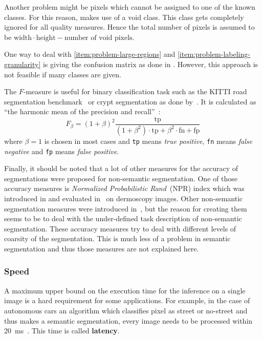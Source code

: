 Another problem might be pixels which cannot be assigned to one of the known
classes. For this reason, \cite{shotton2006textonboost} makes use of a void
class. This class gets completely ignored for all quality measures. Hence the
total number of pixels is assumed to be $\text{width} \cdot \text{height} - \text{number of void pixels}$.

One way to deal with \cref{item:problem-large-regions} and
\cref{item:problem-labeling-granularity} is giving the confusion matrix
as done in \cite{shotton2006textonboost}. However, this approach is not
feasible if many classes are given.

The $F$-measure is useful for binary classification task such as the KITTI road
segmentation benchmark~\cite{Fritsch2013ITSC} or crypt segmentation as done
by~\cite{cohen2015memory}. It is calculated as \enquote{the harmonic mean of
the precision and recall}~\cite{pantofaru2005comparison}:
\[F_\beta = (1+\beta)^2 \frac{\text{tp}}{(1+\beta^2)\cdot \text{tp}+ \beta^2 \cdot \text{fn} + \text{fp}}\]
where $\beta=1$ is chosen in most cases and \texttt{tp} means \textit{true
positive}, \texttt{fn} means \textit{false negative} and  \texttt{fp} means
\textit{false positive}.

Finally, it should be noted that a lot of other measures for the accuracy of
segmentations were proposed for non-semantic segmentation. One of those
accuracy measures is \textit{Normalized Probabilistic Rand}~(NPR) index which
was introduced in \cite{unnikrishnan2005measure} and evaluated
in~\cite{celebi2009improved} on dermoscopy images. Other non-semantic
segmentation measures were introduced in~\cite{martin2001database}, but the
reason for creating them seems to be to deal with the under-defined task
description of non-semantic segmentation. These accuracy measures try to deal
with different levels of coarsity of the segmentation. This is much less of a
problem in semantic segmentation and thus those measures are not explained
here.


\subsubsection{Speed}%
\label{subsubsec:speed-quality-measure}%
A maximum upper bound on the execution time for the inference on a single image
is a hard requirement for some applications. For example, in the case of
autonomous cars an algorithm which classifies pixel as street or no-street
and thus makes a semantic segmentation, every image needs to be processed
within \SI{20}{\milli\second}~\cite{bittel2015pixel}. This time is called
\textbf{latency}.

